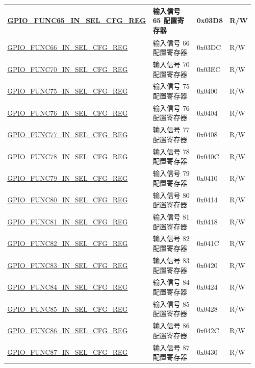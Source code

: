 \begin{longtable}{ | p{6cm} | p{7.2cm} | p{1.3cm} | p{1cm} | }
\hyperref[regdesc:GPIOFUNCRINSELCFGREG]{GPIO\_FUNC65\_IN\_SEL\_CFG\_REG} & 输入信号 65 配置寄存器 & 0x03D8 & R/W \\ \hline
\hyperref[regdesc:GPIOFUNCRINSELCFGREG]{GPIO\_FUNC66\_IN\_SEL\_CFG\_REG} & 输入信号 66 配置寄存器 & 0x03DC & R/W \\ \hline
\hyperref[regdesc:GPIOFUNC70INSELCFGREG]{GPIO\_FUNC70\_IN\_SEL\_CFG\_REG} & 输入信号 70 配置寄存器 & 0x03EC & R/W \\ \hline
\hyperref[regdesc:GPIOFUNCTINSELCFGREG]{GPIO\_FUNC75\_IN\_SEL\_CFG\_REG} & 输入信号 75 配置寄存器 & 0x0400 & R/W \\ \hline
\hyperref[regdesc:GPIOFUNCTINSELCFGREG]{GPIO\_FUNC76\_IN\_SEL\_CFG\_REG} & 输入信号 76 配置寄存器 & 0x0404 & R/W \\ \hline
\hyperref[regdesc:GPIOFUNCTINSELCFGREG]{GPIO\_FUNC77\_IN\_SEL\_CFG\_REG} & 输入信号 77 配置寄存器 & 0x0408 & R/W \\ \hline
\hyperref[regdesc:GPIOFUNCTINSELCFGREG]{GPIO\_FUNC78\_IN\_SEL\_CFG\_REG} & 输入信号 78 配置寄存器 & 0x040C & R/W \\ \hline
\hyperref[regdesc:GPIOFUNCTINSELCFGREG]{GPIO\_FUNC79\_IN\_SEL\_CFG\_REG} & 输入信号 79 配置寄存器 & 0x0410 & R/W \\ \hline
\hyperref[regdesc:GPIOFUNCTINSELCFGREG]{GPIO\_FUNC80\_IN\_SEL\_CFG\_REG} & 输入信号 80 配置寄存器 & 0x0414 & R/W \\ \hline
\hyperref[regdesc:GPIOFUNCTINSELCFGREG]{GPIO\_FUNC81\_IN\_SEL\_CFG\_REG} & 输入信号 81 配置寄存器 & 0x0418 & R/W \\ \hline
\hyperref[regdesc:GPIOFUNCTINSELCFGREG]{GPIO\_FUNC82\_IN\_SEL\_CFG\_REG} & 输入信号 82 配置寄存器 & 0x041C & R/W \\ \hline
\hyperref[regdesc:GPIOFUNCTINSELCFGREG]{GPIO\_FUNC83\_IN\_SEL\_CFG\_REG} & 输入信号 83 配置寄存器 & 0x0420 & R/W \\ \hline
\hyperref[regdesc:GPIOFUNCTINSELCFGREG]{GPIO\_FUNC84\_IN\_SEL\_CFG\_REG} & 输入信号 84 配置寄存器 & 0x0424 & R/W \\ \hline
\hyperref[regdesc:GPIOFUNCTINSELCFGREG]{GPIO\_FUNC85\_IN\_SEL\_CFG\_REG} & 输入信号 85 配置寄存器 & 0x0428 & R/W \\ \hline
\hyperref[regdesc:GPIOFUNCTINSELCFGREG]{GPIO\_FUNC86\_IN\_SEL\_CFG\_REG} & 输入信号 86 配置寄存器 & 0x042C & R/W \\ \hline
\hyperref[regdesc:GPIOFUNCTINSELCFGREG]{GPIO\_FUNC87\_IN\_SEL\_CFG\_REG} & 输入信号 87 配置寄存器 & 0x0430 & R/W \\ \hline

\end{longtable}
